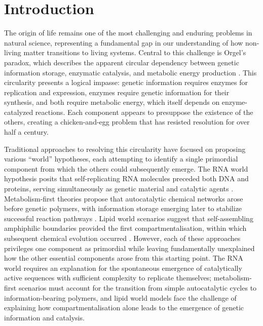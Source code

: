 \documentclass[12pt,a4paper]{article}
\begin{document}
\begin{abstract}
These results establish electron transport partitioning as the thermodynamically inevitable origin of life, replacing stochastic information-first models with a deterministic framework based on physical necessity. The transition from non-living to living systems emerges as a continuous physical process driven by charge dynamics rather than as a discontinuous event requiring improbable information assembly.



\textbf{Keywords:} origin of life, Orgel's paradox, electron transport, charge partitioning, homochirality, membrane evolution, prebiotic chemistry
\end{abstract}

\section{Introduction}
\label{sec:introduction}


The origin of life remains one of the most challenging and enduring problems in natural science, representing a fundamental gap in our understanding of how non-living matter transitions to living systems. Central to this challenge is Orgel's paradox, which describes the apparent circular dependency between genetic information storage, enzymatic catalysis, and metabolic energy production \citep{orgel1968evolution, orgel2004prebiotic}. This circularity presents a logical impasse: genetic information requires enzymes for replication and expression, enzymes require genetic information for their synthesis, and both require metabolic energy, which itself depends on enzyme-catalyzed reactions. Each component appears to presuppose the existence of the others, creating a chicken-and-egg problem that has resisted resolution for over half a century.

Traditional approaches to resolving this circularity have focused on proposing various ``world'' hypotheses, each attempting to identify a single primordial component from which the others could subsequently emerge. The RNA world hypothesis posits that self-replicating RNA molecules preceded both DNA and proteins, serving simultaneously as genetic material and catalytic agents \citep{gilbert1986origin}. Metabolism-first theories propose that autocatalytic chemical networks arose before genetic polymers, with information storage emerging later to stabilize successful reaction pathways \citep{wachtershauser1988before}. Lipid world scenarios suggest that self-assembling amphiphilic boundaries provided the first compartmentalisation, within which subsequent chemical evolution occurred \citep{segre2001lipid}. However, each of these approaches privileges one component as primordial while leaving fundamentally unexplained how the other essential components arose from this starting point. The RNA world requires an explanation for the spontaneous emergence of catalytically active sequences with sufficient complexity to replicate themselves; metabolism-first scenarios must account for the transition from simple autocatalytic cycles to information-bearing polymers, and lipid world models face the challenge of explaining how compartmentalisation alone leads to the emergence of genetic information and catalysis.
\end{document}
